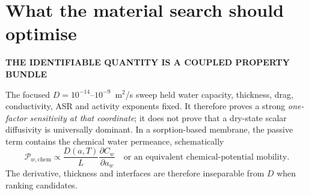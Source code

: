 \documentclass[10pt,a4paper]{article}
\newcommand{\eyebrow}[1]{{\sffamily\bfseries\small\color{Teal}\MakeUppercase{#1}}}
\begin{document}
\section{What the material search should optimise}
\eyebrow{The identifiable quantity is a coupled property bundle}

The focused $D=10^{-14}$--$10^{-9}$~m$^2$/s sweep held water capacity,
thickness, drag, conductivity, ASR and activity exponents fixed. It therefore
proves a strong \emph{one-factor sensitivity at that coordinate}; it does not
prove that a dry-state scalar diffusivity is universally dominant. In a
sorption-based membrane, the passive term contains the chemical water
permeance, schematically
\begin{equation}
  \mathcal{P}_{w,\mathrm{chem}}
  \propto \frac{D(a,T)}{L}
  \frac{\partial C_w}{\partial a_w}
  \quad\text{or an equivalent chemical-potential mobility.}
  \label{eq:chemical-permeance}
\end{equation}
The derivative, thickness and interfaces are therefore inseparable from $D$
when ranking candidates.
\end{document}
